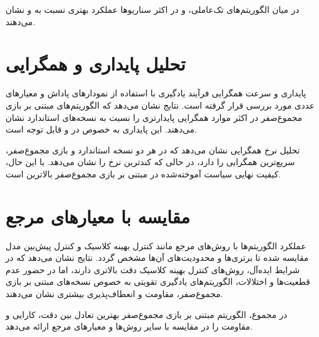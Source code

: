 در میان الگوریتم‌های تک‌عاملی،  و  در اکثر سناریوها عملکرد بهتری نسبت به  و  نشان می‌دهند.

\section{تحلیل پایداری و همگرایی}
\label{sec:stability_analysis}

پایداری و سرعت همگرایی فرآیند یادگیری با استفاده از نمودارهای پاداش و معیارهای عددی مورد بررسی قرار گرفته است. نتایج نشان می‌دهد که الگوریتم‌های مبتنی بر بازی مجموع‌صفر در اکثر موارد همگرایی پایدارتری را نسبت به نسخه‌های استاندارد نشان می‌دهند. این پایداری به خصوص در  و  قابل توجه است.

تحلیل نرخ همگرایی نشان می‌دهد که  در هر دو نسخه استاندارد و بازی مجموع‌صفر، سریع‌ترین همگرایی را دارد، در حالی که  کندترین نرخ را نشان می‌دهد. با این حال، کیفیت نهایی سیاست آموخته‌شده در  مبتنی بر بازی مجموع‌صفر بالاترین است.

\section{مقایسه با معیارهای مرجع}
\label{sec:benchmark_comparison}

عملکرد الگوریتم‌ها با روش‌های مرجع مانند کنترل بهینه کلاسیک و کنترل پیش‌بین مدل مقایسه شده تا برتری‌ها و محدودیت‌های آن‌ها مشخص گردد. نتایج نشان می‌دهد که در شرایط ایده‌آل، روش‌های کنترل بهینه کلاسیک دقت بالاتری دارند، اما در حضور عدم قطعیت‌ها و اختلالات، الگوریتم‌های یادگیری تقویتی به خصوص نسخه‌های مبتنی بر بازی مجموع‌صفر، مقاومت و انعطاف‌پذیری بیشتری نشان می‌دهند.

در مجموع، الگوریتم  مبتنی بر بازی مجموع‌صفر بهترین تعادل بین دقت، کارایی و مقاومت را در مقایسه با سایر روش‌ها و معیارهای مرجع ارائه می‌دهد.












